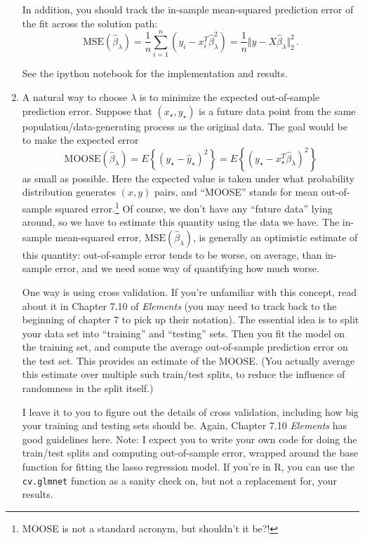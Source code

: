 \documentclass{article}
\begin{document}
\begin{enumerate}[label=(\Alph*)]
In addition, you should track the in-sample mean-squared prediction error of the fit across the solution path:
$$
\mathrm{MSE}(\hat \beta_{\lambda}) = \frac{1}{n} \sum_{i=1}^n (y_i - x_i^T \hat \beta_{\lambda}^2) = \frac{1}{n} \Vert y - X \hat \beta_{\lambda} \Vert_2^2 \, .
$$


{\color{blue}
See the ipython notebook for the implementation and results.
}

\item A natural way to choose $\lambda$ is to minimize the expected out-of-sample prediction error.  Suppose that $(x_{\star}, y_{\star})$ is a future data point from the same population/data-generating process as the original data.  The goal would be to make the expected error
$$
\mathrm{MOOSE}(\hat{\beta}_{\lambda}) =  E \left\{ (y_{\star} - \hat{y}_{\star} )^2 \right\} = E \left\{ (y_{\star} - x_\star^T \hat{\beta}_{\lambda} )^2 \right\} 
$$
as small as possible.  Here the expected value is taken under what probability distribution generates $(x,y)$ pairs, and ``MOOSE'' stands for mean out-of-sample squared error.\footnote{MOOSE is not a standard acronym, but shouldn't it be?!}  Of course, we don't have any ``future data'' lying around, so we have to estimate this quantity using the data we have.  The in-sample mean-squared error, $\mathrm{MSE}(\hat \beta_{\lambda})$, is generally an optimistic estimate of this quantity: out-of-sample error tends to be worse, on average, than in-sample error, and we need some way of quantifying how much worse.

One way is using cross validation.  If you're unfamiliar with this concept, read about it in Chapter 7.10 of \textit{Elements} (you may need to track back to the beginning of chapter 7 to pick up their notation).  The essential idea is to split your data set into ``training'' and ``testing'' sets.  Then you fit the model on the training set, and compute the average out-of-sample prediction error on the test set.  This provides an estimate of the MOOSE.  (You actually average this estimate over multiple such train/test splits, to reduce the influence of randomness in the split itself.)

I leave it to you to figure out the details of cross validation, including how big your training and testing sets should be.  Again, Chapter 7.10 \textit{Elements} has good guidelines here.  Note: I expect you to write your own code for doing the train/test splits and computing out-of-sample error, wrapped around the base function for fitting the lasso regression model.   If you're in R, you can use the \verb|cv.glmnet| function as a sanity check on, but not a replacement for, your results.


\end{enumerate}
\end{document}
